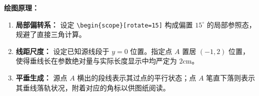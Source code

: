 \vspace{0.5cm}
\textbf{绘图原理：}
\begin{enumerate}
    \item \textbf{局部偏转系：} 设定 \texttt{\textbackslash begin\{scope\}[rotate=15]} 构成偏置 $15^\circ$ 的局部参照态，规避了直接三角计算。
    \item \textbf{线距尺度：} 设定已知源线段于 $y=0$ 位置。指定点 $A$ 置居 $(-1,2)$ 位置，使得垂线长在参数绝对量与实际长度显示中均严定为 $2\text{cm}$。
    \item \textbf{平垂生成：} 源点 $A$ 横出的段线表示其过点的平行状态；点 $A$ 笔直下落则表示其垂线落轨状况，附着对应的角标以供图纸阅读。
\end{enumerate}

\vspace{1.5cm}
